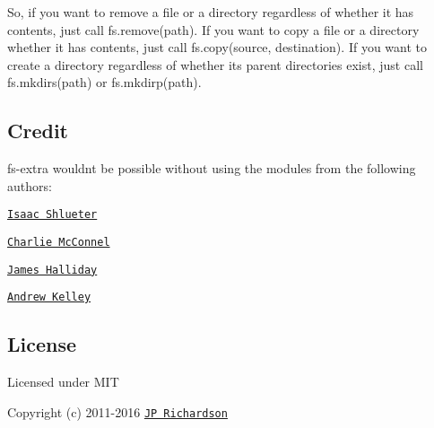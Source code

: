 So, if you want to remove a file or a directory regardless of whether it has contents, just call {\ttfamily fs.\+remove(path)}. If you want to copy a file or a directory whether it has contents, just call {\ttfamily fs.\+copy(source, destination)}. If you want to create a directory regardless of whether its parent directories exist, just call {\ttfamily fs.\+mkdirs(path)} or {\ttfamily fs.\+mkdirp(path)}.

\subsection*{Credit }

{\ttfamily fs-\/extra} wouldn\textquotesingle{}t be possible without using the modules from the following authors\+:


\begin{DoxyItemize}
\item \href{https://github.com/isaacs}{\tt Isaac Shlueter}
\item \href{https://github.com/avianflu}{\tt Charlie Mc\+Connel}
\item \href{https://github.com/substack}{\tt James Halliday}
\item \href{https://github.com/andrewrk}{\tt Andrew Kelley}
\end{DoxyItemize}

\subsection*{License }

Licensed under M\+IT

Copyright (c) 2011-\/2016 \href{https://github.com/jprichardson}{\tt JP Richardson} 